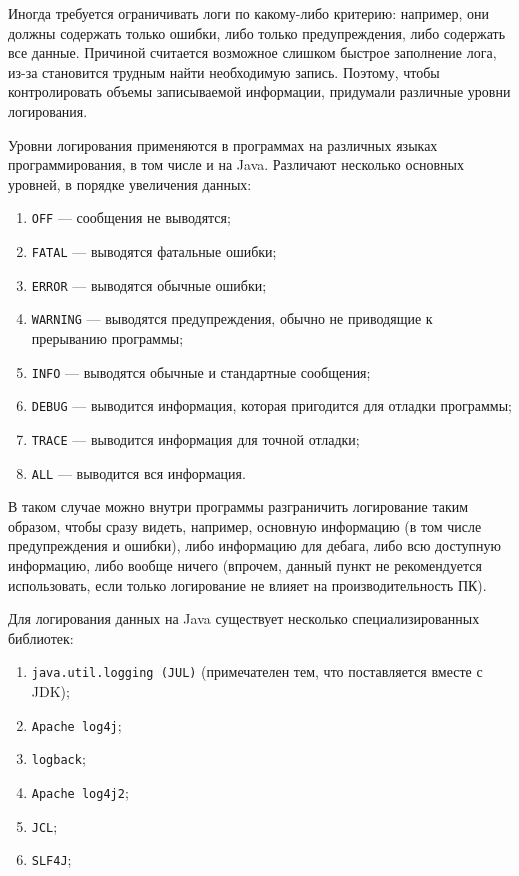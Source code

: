 Иногда требуется ограничивать логи по какому-либо критерию: например, они должны содержать только ошибки, либо  только предупреждения, либо содержать все данные. Причиной считается возможное слишком быстрое заполнение лога, из-за становится трудным найти необходимую запись. Поэтому, чтобы контролировать объемы записываемой информации, придумали различные уровни логирования.

Уровни логирования применяются в программах на различных языках программирования, в том числе и на Java. Различают несколько основных уровней, в порядке увеличения данных:

\begin{enumerate}
    \item \verb|OFF| — сообщения не выводятся;
    \item \verb|FATAL| — выводятся фатальные ошибки;
    \item \verb|ERROR| — выводятся обычные ошибки;
    \item \verb|WARNING| — выводятся предупреждения, обычно не приводящие к прерыванию программы;
    \item \verb|INFO| — выводятся обычные и стандартные сообщения;
    \item \verb|DEBUG| — выводится информация, которая пригодится для отладки программы;
    \item \verb|TRACE| — выводится информация для точной отладки;
    \item \verb|ALL| — выводится вся информация.
\end{enumerate}

В таком случае можно внутри программы разграничить логирование таким образом, чтобы сразу видеть, например, основную информацию (в том числе предупреждения и ошибки), либо информацию для дебага, либо всю доступную информацию, либо вообще ничего (впрочем, данный пункт не рекомендуется использовать, если только логирование не влияет на производительность ПК).

Для логирования данных на Java существует несколько специализированных библиотек:

\begin{enumerate}
    \item \verb|java.util.logging (JUL)| (примечателен тем, что поставляется вместе с JDK);
    \item \verb|Apache log4j|;
    \item \verb|logback|;
    \item \verb|Apache log4j2|;
    \item \verb|JCL|;
    \item \verb|SLF4J|;
\end{enumerate}

